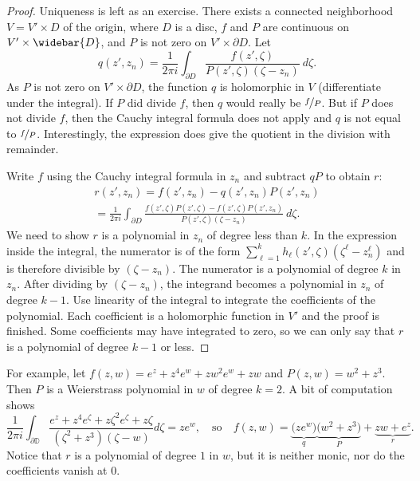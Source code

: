 \documentclass[12pt,openany]{book}
\newcommand{\D}{{\mathbb{D}}}
\theoremstyle{plain}
\theoremstyle{remark}
\theoremstyle{definition}
\theoremstyle{exercise}
\theoremstyle{example}
\begin{document}
\begin{proof}
Uniqueness is left as an exercise.  There exists
a connected neighborhood $V = V' \times D$ of the origin, where
$D$ is a disc,
$f$ and $P$ are continuous on $V' \times \widebar{D}$,
and $P$ is not zero on $V' \times \partial D$.
Let
\begin{equation*}
q(z',z_n) =
\frac{1}{2\pi i} \int_{\partial D} \frac{f(z',\zeta)}{P(z',\zeta)(\zeta-z_n)}
~d\zeta .
\end{equation*}
As $P$ is not zero on $V' \times \partial D$,
the function $q$
is holomorphic in $V$ (differentiate under the integral).
If $P$ did divide $f$, then $q$ would really be $\nicefrac{f}{P}$.
But if $P$ does not divide $f$, then
the Cauchy integral formula does not apply and $q$ is not equal to
$\nicefrac{f}{P}$.  Interestingly,
the expression does give the quotient in the division with remainder.

Write $f$ using the Cauchy integral formula in $z_n$ and
subtract $qP$ to obtain $r$:
\begin{multline*}
r(z',z_n) = f(z',z_n) - q(z',z_n)P(z',z_n)
\\
=
\frac{1}{2\pi i}
\int_{\partial D} \frac{f(z',\zeta)P(z',\zeta) - f(z',\zeta)P(z',z_n)}{P(z',\zeta)(\zeta-z_n)}
~d\zeta .
\end{multline*}
We need to show $r$ is a polynomial in $z_n$ of degree less than
$k$.  In the expression inside the integral, the numerator is
of the form $\sum_{\ell=1}^k h_\ell(z',\zeta)(\zeta^\ell-z_n^\ell)$ and is therefore
divisible by $(\zeta-z_n)$.
The numerator is a polynomial of degree $k$ in
$z_n$.  After dividing by $(\zeta-z_n)$,
the integrand becomes
a polynomial in $z_n$ of degree $k-1$.
Use linearity of the integral
to integrate the coefficients of the polynomial.  Each coefficient is a
holomorphic function in $V'$ and the proof is finished.  Some coefficients may have
integrated to zero, so we can only say that $r$ is a polynomial
of degree $k-1$ or less.
\end{proof}

For example, let $f(z,w) = e^z + z^4 e^w + z w^2 e^w + zw$ and $P(z,w)
= w^2 + z^3$.  Then $P$ is a Weierstrass polynomial in $w$ of degree $k=2$.  A bit
of computation shows
\begin{equation*}
\frac{1}{2\pi i}
\int_{\partial \D}
\frac{e^z + z^4 e^{\zeta} + z {\zeta}^2 e^{\zeta} + z \zeta}{(\zeta^2+z^3)(\zeta-w)}
d\zeta
=
z e^w
,
\quad \text{so} \quad
f(z,w) = \underbrace{\bigl( ze^w \bigr)}_{q} \underbrace{\bigl( w^2 + z^3 \bigr)}_{P} +
\underbrace{z w + e^z}_{r} .
\end{equation*}
Notice that $r$ is a polynomial of degree $1$ in $w$, but it is neither monic,
nor do the coefficients vanish at $0$.
\end{document}
